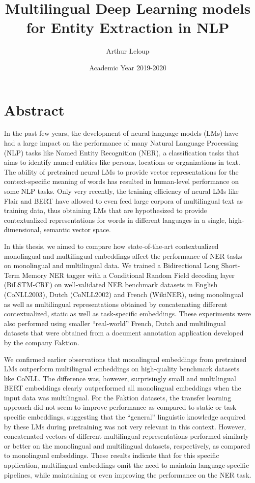 \documentclass[12pt,a4paper,]{book}
\title{Multilingual Deep Learning models for Entity Extraction in NLP}
\author{Arthur Leloup}
\date{Academic Year 2019-2020}
\begin{document}
\maketitle

{
\setcounter{tocdepth}{1}
\tableofcontents
}
\frontmatter

\hypertarget{abstract}{%
\chapter*{Abstract}\label{abstract}}

In the past few years, the development of neural language models (LMs) have had a large impact on the performance of many Natural Language Processing (NLP) tasks like Named Entity Recognition (NER), a classification tasks that aims to identify named entities like persons, locations or organizations in text. The ability of pretrained neural LMs to provide vector representations for the context-specific meaning of words has resulted in human-level performance on some NLP tasks. Only very recently, the training efficiency of neural LMs like Flair and BERT have allowed to even feed large corpora of multilingual text as training data, thus obtaining LMs that are hypothesized to provide contextualized representations for words in different languages in a single, high-dimensional, semantic vector space.

In this thesis, we aimed to compare how state-of-the-art contextualized monolingual and multilingual embeddings affect the performance of NER tasks on monolingual and multilingual data. We trained a Bidirectional Long Short-Term Memory NER tagger with a Conditional Random Field decoding layer (BiLSTM-CRF) on well-validated NER benchmark datasets in English (CoNLL2003), Dutch (CoNLL2002) and French (WikiNER), using monolingual as well as multilingual representations obtained by concatenating different contextualized, static as well as task-specific embeddings. These experiments were also performed using smaller ``real-world'' French, Dutch and multilingual datasets that were obtained from a document annotation application developed by the company Faktion.

We confirmed earlier observations that monolingual embeddings from pretrained LMs outperform multilingual embeddings on high-quality benchmark datasets like CoNLL. The difference was, however, surprisingly small and multilingual BERT embeddings clearly outperformed all monolingual embeddings when the input data was multilingual. For the Faktion datasets, the transfer learning approach did not seem to improve performance as compared to static or task-specific embeddings, suggesting that the ``general'' linguistic knowledge acquired by these LMs during pretraining was not very relevant in this context. However, concatenated vectors of different multilingual representations performed similarly or better on the monolingual and multilingual datasets, respectively, as compared to monolingual embeddings. These results indicate that for this specific application, multilingual embeddings omit the need to maintain language-specific pipelines, while maintaining or even improving the performance on the NER task.
\end{document}
